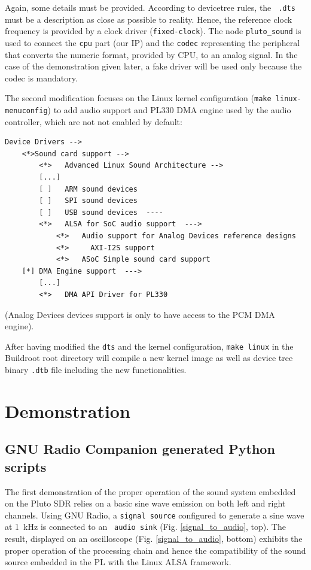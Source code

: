 \documentclass[12pt,oneside]{article}
\begin{document}
Again, some details must be provided. According to devicetree rules, the {\tt
.dts} must be a description as close as possible to reality. Hence, the
reference clock frequency is provided by a clock driver ({\tt fixed-clock}).
The node {\tt pluto\_sound} is used to connect the {\tt cpu} part (our IP) and the
{\tt codec} representing the peripheral that converts the numeric format,
provided by CPU, to an analog signal. In the case of the demonstration given later,
a fake driver will be used only because the codec is mandatory.

The second modification focuses on the Linux kernel configuration 
({\tt make linux-menuconfig}) to add audio support and PL330 DMA engine used by
the audio controller, which are not not enabled by default:
{\footnotesize
\begin{verbatim}
Device Drivers -->
    <*>Sound card support -->
        <*>   Advanced Linux Sound Architecture -->
        [...]
        [ ]   ARM sound devices
        [ ]   SPI sound devices
        [ ]   USB sound devices  ----
        <*>   ALSA for SoC audio support  ---> 
            <*>   Audio support for Analog Devices reference designs
            <*>     AXI-I2S support
            <*>   ASoC Simple sound card support
    [*] DMA Engine support  --->
        [...]
        <*>   DMA API Driver for PL330
\end{verbatim}
}

(Analog Devices devices support is only to have access to the PCM DMA engine).

After having modified the {\tt dts} and the kernel configuration, {\tt make linux}
in the Buildroot root directory will compile a new kernel image as well as
device tree binary {\tt .dtb} file including the new functionalities.

\section{Demonstration}

\subsection{GNU Radio Companion generated Python scripts}

The first demonstration of the proper operation of the sound system embedded on the Pluto SDR
relies on a basic sine wave emission on both left and right channels. Using GNU Radio,
a {\tt signal source} configured to generate a sine wave at 1~kHz is connected to an {\tt 
audio sink} (Fig. \ref{signal_to_audio}, top). The result, displayed on an oscilloscope 
(Fig. \ref{signal_to_audio}, bottom) exhibits the proper operation of the processing chain and
hence the compatibility of the sound source embedded in the PL with the Linux ALSA framework.
\end{document}
